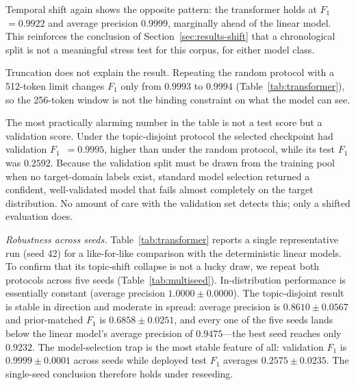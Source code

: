 \documentclass[conference]{IEEEtran}
\newcommand{\Fone}{$F_1$}
\begin{document}
Temporal shift again shows the opposite pattern: the transformer holds at
\Fone{}~$=0.9922$ and average precision $0.9999$, marginally ahead of the linear
model. This reinforces the conclusion of Section~\ref{sec:results-shift} that a
chronological split is not a meaningful stress test for this corpus, for either
model class.

Truncation does not explain the result. Repeating the random protocol with a
512-token limit changes \Fone{} only from $0.9993$ to $0.9994$
(Table~\ref{tab:transformer}), so the 256-token window is not the binding
constraint on what the model can see.

The most practically alarming number in the table is not a test score but a
validation score. Under the topic-disjoint protocol the selected checkpoint had
validation \Fone{}~$=0.9995$, higher than under the random protocol, while its
test \Fone{} was $0.2592$. Because the validation split must be drawn from the
training pool when no target-domain labels exist, standard model selection
returned a confident, well-validated model that fails almost completely on the
target distribution. No amount of care with the validation set detects this;
only a shifted evaluation does.

\emph{Robustness across seeds.} Table~\ref{tab:transformer} reports a single
representative run (seed 42) for a like-for-like comparison with the
deterministic linear models. To confirm that its topic-shift collapse is not a
lucky draw, we repeat both protocols across five seeds
(Table~\ref{tab:multiseed}). In-distribution performance is essentially constant
(average precision $1.0000 \pm 0.0000$). The topic-disjoint result is stable in
direction and moderate in spread: average precision is $0.8610 \pm 0.0567$ and
prior-matched \Fone{} is $0.6858 \pm 0.0251$, and every one of the five seeds
lands below the linear model's average precision of $0.9475$---the best seed
reaches only $0.9232$. The model-selection trap is the most stable feature of
all: validation \Fone{} is $0.9999 \pm 0.0001$ across seeds while deployed test
\Fone{} averages $0.2575 \pm 0.0235$. The single-seed conclusion therefore holds
under reseeding.
\end{document}
